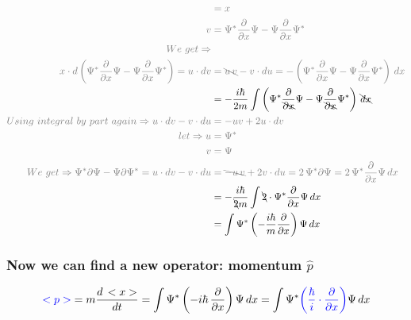 \begin{align}
        &\color{gray} = x\\
        \color{gray} v
        &\color{gray} = \Psi^*\dfrac{\partial}{\partial x}\Psi - \Psi \dfrac{\partial}{\partial x}\Psi^*\\
        \color{gray} We~get\Rightarrow\\
        \color{gray} x \cdot d \left( \Psi^*\dfrac{\partial}{\partial x}\Psi - \Psi \dfrac{\partial}{\partial x}\Psi^* \right)
        = u\cdot dv
        &\color{gray} = \bcancel{u\,v} - v\cdot du
        = - \left( \Psi^*\dfrac{\partial}{\partial x}\Psi - \Psi \dfrac{\partial}{\partial x}\Psi^* \right)\,dx\\
        &=  -\dfrac{i\hbar}{2m} \int \left( \Psi^*\dfrac{\partial}{\bcancel{\partial x}}\Psi - \Psi \dfrac{\partial}{\bcancel{\partial x}}\Psi^* \right) \,\bcancel{dx}\\
        \color{gray} Using~integral~by~part~again\Rightarrow u\cdot dv - v\cdot du
        &\color{gray} = - uv + 2u\cdot dv\\
        \color{gray} let\Rightarrow u 
        &\color{gray} = \Psi^*\\
        \color{gray} v
        &\color{gray} = \Psi\\
        \color{gray} We~get\Rightarrow
        \color{gray} \Psi^*\partial\Psi - \Psi \partial\Psi^*
        = u\cdot dv - v\cdot du
        &\color{gray} = \bcancel{-u\,v} + 2v\cdot du
        = 2\,\Psi^* \partial\Psi
        = 2\,\Psi^* \dfrac{\partial}{\partial x}\Psi\,dx\\
        &= -\dfrac{i\hbar}{\bcancel{2}m} \int \bcancel{2}\cdot \Psi^* \dfrac{\partial}{\partial x}\Psi\,dx\\
        &= \int \Psi^* \left(-\dfrac{i\hbar}{m}\dfrac{\partial}{\partial x}\right)\Psi\,dx
    \end{align}
    \subsubsection*{Now we can find a new operator: momentum $\hat{p}$}
    \[
        {\color{blue}<p>} = m\dfrac{d\,<x>}{dt} = \int \Psi^* \left(-i\hbar\,\dfrac{\partial}{\partial x}\right)\Psi\,dx = \int \Psi^* {\color{blue}\left(\dfrac{\hbar}{i}\cdot\dfrac{\partial}{\partial x}\right)}\Psi\,dx
    \]
